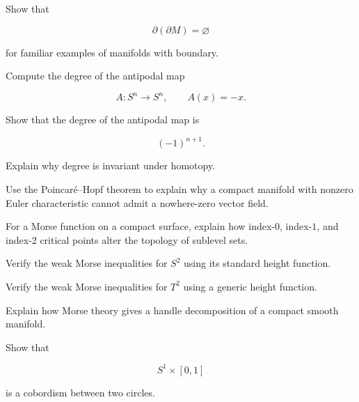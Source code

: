\begin{exercise}[3]
Show that

\[
\partial(\partial M)=\varnothing
\]

for familiar examples of manifolds with boundary.
\end{exercise}

\begin{exercise}[3]
Compute the degree of the antipodal map

\[
A:S^n\to S^n,
\qquad
A(x)=-x.
\]
\end{exercise}

\begin{exercise}[3]
Show that the degree of the antipodal map is

\[
(-1)^{n+1}.
\]
\end{exercise}

\begin{exercise}[3]
Explain why degree is invariant under homotopy.
\end{exercise}

\begin{exercise}[3]
Use the Poincar\'e--Hopf theorem to explain why a compact manifold with
nonzero Euler characteristic cannot admit a nowhere-zero vector field.
\end{exercise}

\begin{exercise}[3]
For a Morse function on a compact surface, explain how index-\(0\),
index-\(1\), and index-\(2\) critical points alter the topology of sublevel
sets.
\end{exercise}

\begin{exercise}[3]
Verify the weak Morse inequalities for \(S^2\) using its standard height
function.
\end{exercise}

\begin{exercise}[3]
Verify the weak Morse inequalities for \(T^2\) using a generic height
function.
\end{exercise}

\begin{exercise}[3]
Explain how Morse theory gives a handle decomposition of a compact smooth
manifold.
\end{exercise}

\begin{exercise}[3]
Show that

\[
S^1\times[0,1]
\]

is a cobordism between two circles.
\end{exercise}


